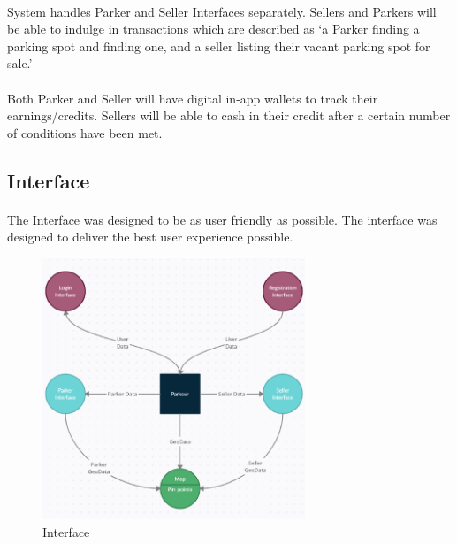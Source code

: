         \paragraph*{}
        System handles Parker and Seller Interfaces separately. Sellers and Parkers will be able to indulge in transactions which are described as ‘a Parker finding a parking spot and finding one, and a seller listing their vacant parking spot for sale.’\\
        \paragraph*{}
        Both Parker and Seller will have digital in-app wallets to track their earnings/credits. Sellers will be able to cash in their credit after a certain number of conditions have been met.

        \subsection{Interface}
        \paragraph*{}
        The Interface was designed to be as user friendly as possible.
        The interface was designed to deliver the best user experience possible.\\

        \begin{figure}[h]
            \centering
            \includegraphics[width=0.7\textwidth]{images/externalInterface.png}
            \caption{Interface}
            \label{fig:interface}
        \end{figure}


